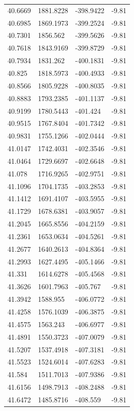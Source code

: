 \begin{table}[H]
\begin{tabular}{llll}
40.6669 & 1881.8228 & -398.9422 & -9.81 \\
40.6985 & 1869.1973 & -399.2524 & -9.81 \\
40.7301 & 1856.562 & -399.5626 & -9.81 \\
40.7618 & 1843.9169 & -399.8729 & -9.81 \\
40.7934 & 1831.262 & -400.1831 & -9.81 \\
40.825 & 1818.5973 & -400.4933 & -9.81 \\
40.8566 & 1805.9228 & -400.8035 & -9.81 \\
40.8883 & 1793.2385 & -401.1137 & -9.81 \\
40.9199 & 1780.5443 & -401.424 & -9.81 \\
40.9515 & 1767.8404 & -401.7342 & -9.81 \\
40.9831 & 1755.1266 & -402.0444 & -9.81 \\
41.0147 & 1742.4031 & -402.3546 & -9.81 \\
41.0464 & 1729.6697 & -402.6648 & -9.81 \\
41.078 & 1716.9265 & -402.9751 & -9.81 \\
41.1096 & 1704.1735 & -403.2853 & -9.81 \\
41.1412 & 1691.4107 & -403.5955 & -9.81 \\
41.1729 & 1678.6381 & -403.9057 & -9.81 \\
41.2045 & 1665.8556 & -404.2159 & -9.81 \\
41.2361 & 1653.0634 & -404.5261 & -9.81 \\
41.2677 & 1640.2613 & -404.8364 & -9.81 \\
41.2993 & 1627.4495 & -405.1466 & -9.81 \\
41.331 & 1614.6278 & -405.4568 & -9.81 \\
41.3626 & 1601.7963 & -405.767 & -9.81 \\
41.3942 & 1588.955 & -406.0772 & -9.81 \\
41.4258 & 1576.1039 & -406.3875 & -9.81 \\
41.4575 & 1563.243 & -406.6977 & -9.81 \\
41.4891 & 1550.3723 & -407.0079 & -9.81 \\
41.5207 & 1537.4918 & -407.3181 & -9.81 \\
41.5523 & 1524.6014 & -407.6283 & -9.81 \\
41.584 & 1511.7013 & -407.9386 & -9.81 \\
41.6156 & 1498.7913 & -408.2488 & -9.81 \\
41.6472 & 1485.8716 & -408.559 & -9.81 \\

\end{tabular}
\end{table}

